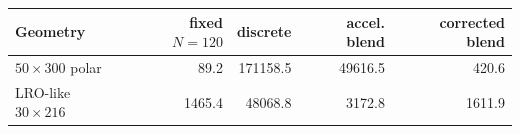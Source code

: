 \begin{tabular}{@{}lrrrr@{}}
  \toprule
  Geometry & fixed $N=120$ & discrete & accel. blend & corrected blend \\
  \midrule
  $50\times300$ polar & 89.2 & 171158.5 & 49616.5 & 420.6 \\
  LRO-like $30\times216$ & 1465.4 & 48068.8 & 3172.8 & 1611.9 \\
  \bottomrule
\end{tabular}
